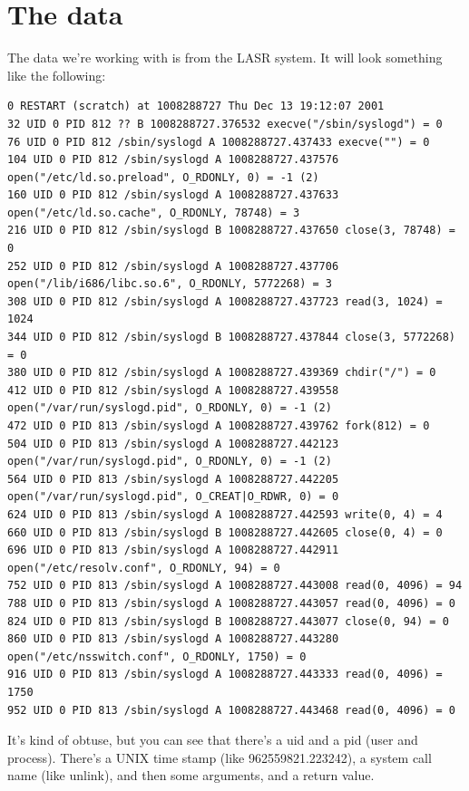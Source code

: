 \documentclass{article}
\begin{document}
\section{The data}
The data we're working with is from the LASR system.  It will look something like the following:
\begin{verbatim}
0 RESTART (scratch) at 1008288727 Thu Dec 13 19:12:07 2001
32 UID 0 PID 812 ?? B 1008288727.376532 execve("/sbin/syslogd") = 0
76 UID 0 PID 812 /sbin/syslogd A 1008288727.437433 execve("") = 0
104 UID 0 PID 812 /sbin/syslogd A 1008288727.437576 open("/etc/ld.so.preload", O_RDONLY, 0) = -1 (2)
160 UID 0 PID 812 /sbin/syslogd A 1008288727.437633 open("/etc/ld.so.cache", O_RDONLY, 78748) = 3
216 UID 0 PID 812 /sbin/syslogd B 1008288727.437650 close(3, 78748) = 0
252 UID 0 PID 812 /sbin/syslogd A 1008288727.437706 open("/lib/i686/libc.so.6", O_RDONLY, 5772268) = 3
308 UID 0 PID 812 /sbin/syslogd A 1008288727.437723 read(3, 1024) = 1024
344 UID 0 PID 812 /sbin/syslogd B 1008288727.437844 close(3, 5772268) = 0
380 UID 0 PID 812 /sbin/syslogd A 1008288727.439369 chdir("/") = 0
412 UID 0 PID 812 /sbin/syslogd A 1008288727.439558 open("/var/run/syslogd.pid", O_RDONLY, 0) = -1 (2)
472 UID 0 PID 813 /sbin/syslogd A 1008288727.439762 fork(812) = 0
504 UID 0 PID 813 /sbin/syslogd A 1008288727.442123 open("/var/run/syslogd.pid", O_RDONLY, 0) = -1 (2)
564 UID 0 PID 813 /sbin/syslogd A 1008288727.442205 open("/var/run/syslogd.pid", O_CREAT|O_RDWR, 0) = 0
624 UID 0 PID 813 /sbin/syslogd A 1008288727.442593 write(0, 4) = 4
660 UID 0 PID 813 /sbin/syslogd B 1008288727.442605 close(0, 4) = 0
696 UID 0 PID 813 /sbin/syslogd A 1008288727.442911 open("/etc/resolv.conf", O_RDONLY, 94) = 0
752 UID 0 PID 813 /sbin/syslogd A 1008288727.443008 read(0, 4096) = 94
788 UID 0 PID 813 /sbin/syslogd A 1008288727.443057 read(0, 4096) = 0
824 UID 0 PID 813 /sbin/syslogd B 1008288727.443077 close(0, 94) = 0
860 UID 0 PID 813 /sbin/syslogd A 1008288727.443280 open("/etc/nsswitch.conf", O_RDONLY, 1750) = 0
916 UID 0 PID 813 /sbin/syslogd A 1008288727.443333 read(0, 4096) = 1750
952 UID 0 PID 813 /sbin/syslogd A 1008288727.443468 read(0, 4096) = 0
\end{verbatim}

It's kind of obtuse, but you can see that there's a uid and a pid (user and process). There's a UNIX time stamp (like 962559821.223242), a system call name (like unlink), and then some arguments, and a return value.
\end{document}

